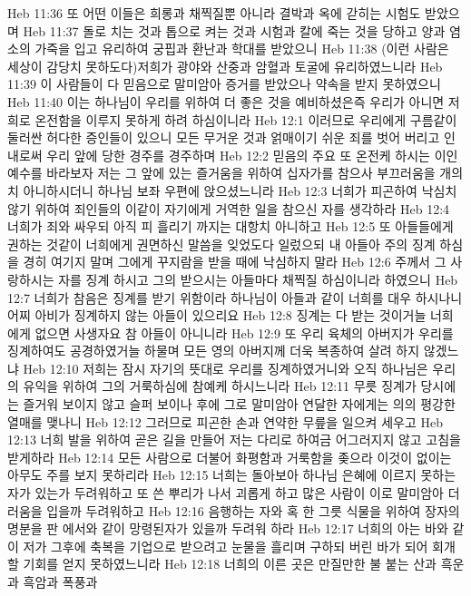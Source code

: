 Heb 11:36  또 어떤 이들은 희롱과 채찍질뿐 아니라 결박과 옥에 갇히는 시험도 받았으며
Heb 11:37  돌로 치는 것과 톱으로 켜는 것과 시험과 칼에 죽는 것을 당하고 양과 염소의 가죽을 입고 유리하여 궁핍과 환난과 학대를 받았으니
Heb 11:38  (이런 사람은 세상이 감당치 못하도다)저희가 광야와 산중과 암혈과 토굴에 유리하였느니라
Heb 11:39  이 사람들이 다 믿음으로 말미암아 증거를 받았으나 약속을 받지 못하였으니
Heb 11:40  이는 하나님이 우리를 위하여 더 좋은 것을 예비하셨은즉 우리가 아니면 저희로 온전함을 이루지 못하게 하려 하심이니라
Heb 12:1  이러므로 우리에게 구름같이 둘러싼 허다한 증인들이 있으니 모든 무거운 것과 얽매이기 쉬운 죄를 벗어 버리고 인내로써 우리 앞에 당한 경주를 경주하며
Heb 12:2  믿음의 주요 또 온전케 하시는 이인 예수를 바라보자 저는 그 앞에 있는 즐거움을 위하여 십자가를 참으사 부끄러움을 개의치 아니하시더니 하나님 보좌 우편에 앉으셨느니라
Heb 12:3  너희가 피곤하여 낙심치 않기 위하여 죄인들의 이같이 자기에게 거역한 일을 참으신 자를 생각하라
Heb 12:4  너희가 죄와 싸우되 아직 피 흘리기 까지는 대항치 아니하고
Heb 12:5  또 아들들에게 권하는 것같이 너희에게 권면하신 말씀을 잊었도다 일렀으되 내 아들아 주의 징계 하심을 경히 여기지 말며 그에게 꾸지람을 받을 때에 낙심하지 말라
Heb 12:6  주께서 그 사랑하시는 자를 징계 하시고 그의 받으시는 아들마다 채찍질 하심이니라 하였으니
Heb 12:7  너희가 참음은 징계를 받기 위함이라 하나님이 아들과 같이 너희를 대우 하시나니 어찌 아비가 징계하지 않는 아들이 있으리요
Heb 12:8  징계는 다 받는 것이거늘 너희에게 없으면 사생자요 참 아들이 아니니라
Heb 12:9  또 우리 육체의 아버지가 우리를 징계하여도 공경하였거늘 하물며 모든 영의 아버지께 더욱 복종하여 살려 하지 않겠느냐
Heb 12:10  저희는 잠시 자기의 뜻대로 우리를 징계하였거니와 오직 하나님은 우리의 유익을 위하여 그의 거룩하심에 참예케 하시느니라
Heb 12:11  무릇 징계가 당시에는 즐거워 보이지 않고 슬퍼 보이나 후에 그로 말미암아 연달한 자에게는 의의 평강한 열매를 맺나니
Heb 12:12  그러므로 피곤한 손과 연약한 무릎을 일으켜 세우고
Heb 12:13  너희 발을 위하여 곧은 길을 만들어 저는 다리로 하여금 어그러지지 않고 고침을 받게하라
Heb 12:14  모든 사람으로 더불어 화평함과 거룩함을 좆으라 이것이 없이는 아무도 주를 보지 못하리라
Heb 12:15  너희는 돌아보아 하나님 은혜에 이르지 못하는 자가 있는가 두려워하고 또 쓴 뿌리가 나서 괴롭게 하고 많은 사람이 이로 말미암아 더러움을 입을까 두려워하고
Heb 12:16  음행하는 자와 혹 한 그릇 식물을 위하여 장자의 명분을 판 에서와 같이 망령된자가 있을까 두려워 하라
Heb 12:17  너희의 아는 바와 같이 저가 그후에 축복을 기업으로 받으려고 눈물을 흘리며 구하되 버린 바가 되어 회개할 기회를 얻지 못하였느니라
Heb 12:18  너희의 이른 곳은 만질만한 불 붙는 산과 흑운과 흑암과 폭풍과
